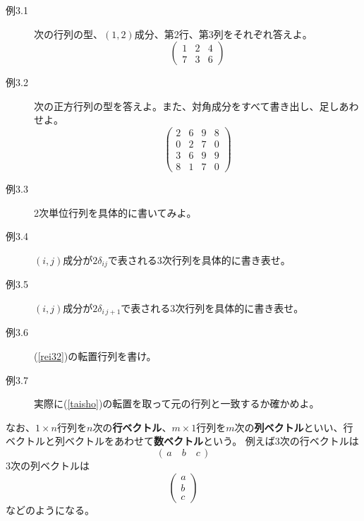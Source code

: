 \documentclass[10pt]{jsreport}
\theoremstyle{definition}%
\newcommand{\kakko}[1]{\left(#1 \right)} %
\numberwithin{equation}{section}%
\begin{document}
\begin{description}
  \item[例3.1] 次の行列の型、$(1,2)$成分、第2行、第3列をそれぞれ答えよ。
  \begin{equation}
    \left( 
      \begin{matrix}
        1 & 2 & 4 \\
        7 & 3 & 6
      \end{matrix}
    \right)
  \end{equation}
  \item[例3.2] 次の正方行列の型を答えよ。また、対角成分をすべて書き出し、足しあわせよ。
  \begin{equation}
  \label{rei32}  \left( 
      \begin{matrix}
        2 & 6 & 9 & 8\\
        0 & 2 & 7 & 0 \\
        3 & 6 & 9 & 9 \\
        8 & 1 & 7 & 0
      \end{matrix}
    \right)
  \end{equation}
  \item[例3.3] 2次単位行列を具体的に書いてみよ。
  \item[例3.4] $(i,j)$成分が$2\delta_{ij}$で表される3次行列を具体的に書き表せ。 
  \item[例3.5] $(i,j)$成分が$2\delta_{i\, j+1}$で表される3次行列を具体的に書き表せ。 
  \item[例3.6] (\ref{rei32})の転置行列を書け。
  \item[例3.7] 実際に(\ref{taisho})の転置を取って元の行列と一致するか確かめよ。
\end{description}
なお、$1\times n$行列を$n$次の{\bf 行ベクトル}、$m\times 1$行列を$m$次の{\bf 列ベクトル}といい、行ベクトルと列ベクトルをあわせて{\bf 数ベクトル}という。
例えば3次の行ベクトルは
\begin{equation}
  (\, a \quad b \quad c \,)
\end{equation}
3次の列ベクトルは
\begin{equation}
  \kakko{
    \begin{matrix}
      a\\
      b\\
      c
    \end{matrix}
  }
\end{equation}
などのようになる。


\end{document}
